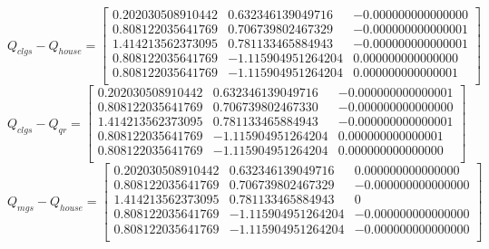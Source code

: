 \documentclass{article}
\begin{document}
            \begin{equation*}
                Q_{clgs} - Q_{house} = \left[
                \begin{array}{ccc}
                    0.202030508910442 &  0.632346139049716 & -0.000000000000000\\
                    0.808122035641769 &  0.706739802467329 & -0.000000000000001\\
                    1.414213562373095 &  0.781133465884943 & -0.000000000000001\\
                    0.808122035641769 & -1.115904951264204 &  0.000000000000000\\
                    0.808122035641769 & -1.115904951264204 &  0.000000000000001\\
                \end{array}
                \right]
            \end{equation*}
            \begin{equation*}
                Q_{clgs} - Q_{qr} = \left[
                \begin{array}{ccc}
                    0.202030508910442 &  0.632346139049716 & -0.000000000000001\\
                    0.808122035641769 &  0.706739802467330 & -0.000000000000000\\
                    1.414213562373095 &  0.781133465884943 & -0.000000000000001\\
                    0.808122035641769 & -1.115904951264204 &  0.000000000000001\\
                    0.808122035641769 & -1.115904951264204 &  0.000000000000000\\
                \end{array}
                \right]
            \end{equation*}
            \begin{equation*}
                Q_{mgs} - Q_{house} = \left[
                \begin{array}{ccc}
                    0.202030508910442 &  0.632346139049716 &  0.000000000000000\\
                    0.808122035641769 &  0.706739802467329 & -0.000000000000000\\
                    1.414213562373095 &  0.781133465884943 &                  0\\
                    0.808122035641769 & -1.115904951264204 & -0.000000000000000\\
                    0.808122035641769 & -1.115904951264204 & -0.000000000000000\\
                \end{array}
                \right]
            \end{equation*}
\end{document}
